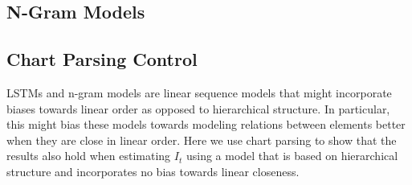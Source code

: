 \documentclass[11pt,letterpaper]{article}
\begin{document}





\subsection{N-Gram Models}






%
%
%
%
%
%

\subsection{Chart Parsing Control}

LSTMs and n-gram models are linear sequence models that might incorporate biases towards linear order as opposed to hierarchical structure.
In particular, this might bias these models towards modeling relations between elements better when they are close in linear order.
Here we use chart parsing to show that the results also hold when estimating $I_t$ using a model that is based on hierarchical structure and incorporates no bias towards linear closeness.
\end{document}
